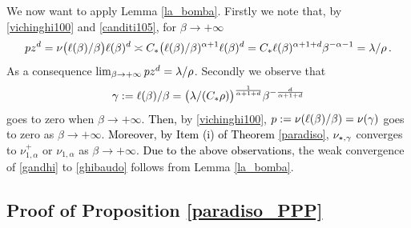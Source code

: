 \documentclass[12pt,a4paper,reqno]{amsart}
\newtheorem{Lemma}[Theorem]{Lemma}
\newcommand{\cV}{\ensuremath{\mathcal V}}
\let\a=\alpha \let\b=\beta   \let\d=\delta  \let\e=\varepsilon
\newcommand{\rosso}{\textcolor{black}} %
\begin{document}
We now want to apply Lemma \ref{la_bomba}. 
Firstly we   note that, by \eqref{vichinghi100} and \eqref{canditi105},   for $\b \to +\infty$
\[ 
p z^d= \nu\bigl( \ell(\b)/\b\bigr) \ell(\b)^d\asymp C_*  \bigl(\ell(\b)/\b) ^{\a+1} \ell(\b)^d =C_* \ell(\b)^{\a+1+d} \b ^{-\a-1}=\l/ \rho \,.
\]
As a consequence $\lim_{\b \to +\infty }p z^d = \l/\rho$.
  Secondly  we observe that 
  \[
  \g:=\ell(\b)/\b= \bigl(\l /(C_* \rho)\bigr)^{\frac{1}{\a+1+d}} \b ^{-\frac{d}{\a+1+d}}
  \] goes to zero when $\b \to+\infty$. \rosso{Then,} by \eqref{vichinghi100},  
  $p:=\nu( \ell(\b)/\b)=\nu(\g)$  goes to zero as  $\b \to +\infty$. \rosso{Moreover,} \rosso{by Item (i) of Theorem \ref{paradiso}}, $\nu_{\star,\gamma}$ converges to $\nu^+_{1,\a}$ or $\nu_{1,\a}$ as $\b \to +\infty$. \rosso{Due to the above observations}, the weak convergence of \eqref{gandhi} to \eqref{ghibaudo}  follows from Lemma \ref{la_bomba}. 


\subsection{Proof of  Proposition \ref{paradiso_PPP}}\label{Trento}
%
\end{document}
